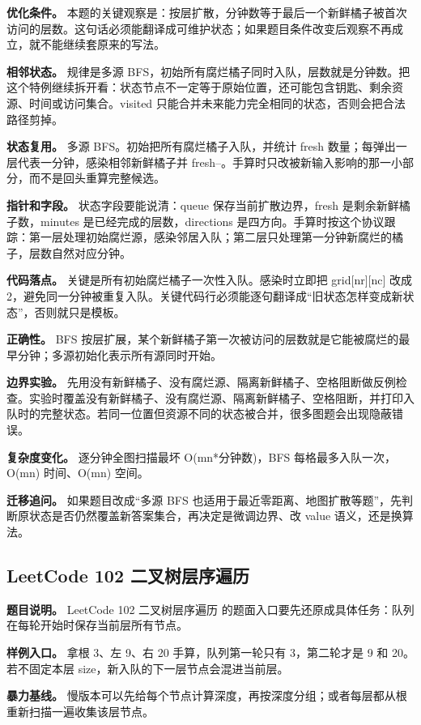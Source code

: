 \textbf{优化条件。} 本题的关键观察是：按层扩散，分钟数等于最后一个新鲜橘子被首次访问的层数。这句话必须能翻译成可维护状态；如果题目条件改变后观察不再成立，就不能继续套原来的写法。

\textbf{相邻状态。} 规律是多源 BFS，初始所有腐烂橘子同时入队，层数就是分钟数。把这个特例继续拆开看：状态节点不一定等于原始位置，还可能包含钥匙、剩余资源、时间或访问集合。visited 只能合并未来能力完全相同的状态，否则会把合法路径剪掉。

\textbf{状态复用。} 多源 BFS。初始把所有腐烂橘子入队，并统计 fresh 数量；每弹出一层代表一分钟，感染相邻新鲜橘子并 fresh--。手算时只改被新输入影响的那一小部分，而不是回头重算完整候选。

\textbf{指针和字段。} 状态字段要能说清：queue 保存当前扩散边界，fresh 是剩余新鲜橘子数，minutes 是已经完成的层数，directions 是四方向。手算时按这个协议跟踪：第一层处理初始腐烂源，感染邻居入队；第二层只处理第一分钟新腐烂的橘子，层数自然对应分钟。

\textbf{代码落点。} 关键是所有初始腐烂橘子一次性入队。感染时立即把 grid[nr][nc] 改成 2，避免同一分钟被重复入队。关键代码行必须能逐句翻译成“旧状态怎样变成新状态”，否则就只是模板。

\textbf{正确性。} BFS 按层扩展，某个新鲜橘子第一次被访问的层数就是它能被腐烂的最早分钟；多源初始化表示所有源同时开始。

\textbf{边界实验。} 先用没有新鲜橘子、没有腐烂源、隔离新鲜橘子、空格阻断做反例检查。实验时覆盖没有新鲜橘子、没有腐烂源、隔离新鲜橘子、空格阻断，并打印入队时的完整状态。若同一位置但资源不同的状态被合并，很多图题会出现隐蔽错误。

\textbf{复杂度变化。} 逐分钟全图扫描最坏 O(mn*分钟数)，BFS 每格最多入队一次，O(mn) 时间、O(mn) 空间。

\textbf{迁移追问。} 如果题目改成“多源 BFS 也适用于最近零距离、地图扩散等题”，先判断原状态是否仍然覆盖新答案集合，再决定是微调边界、改 value 语义，还是换算法。

\subsection{LeetCode 102 二叉树层序遍历}

\textbf{题目说明。} LeetCode 102 二叉树层序遍历 的题面入口要先还原成具体任务：队列在每轮开始时保存当前层所有节点。

\textbf{样例入口。} 拿根 3、左 9、右 20 手算，队列第一轮只有 3，第二轮才是 9 和 20。若不固定本层 size，新入队的下一层节点会混进当前层。

\textbf{暴力基线。} 慢版本可以先给每个节点计算深度，再按深度分组；或者每层都从根重新扫描一遍收集该层节点。


